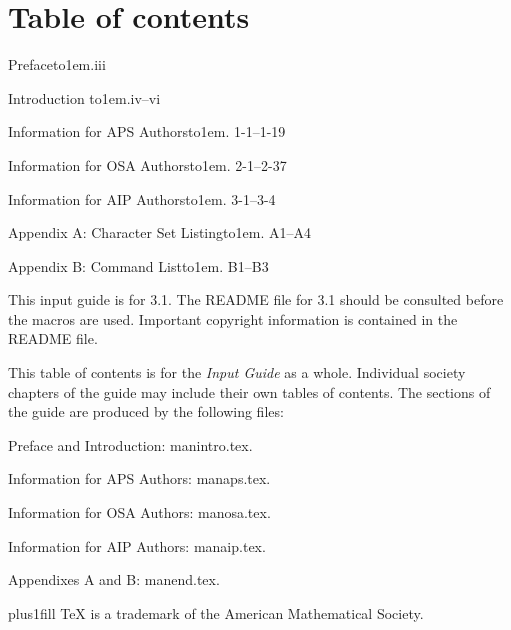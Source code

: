 \section*{Table of contents}
{ \rightskip\leftskip


\vspace{.4in}
{\parindent0pt\baselineskip

Preface\leaders\hbox to1em{\hfil.\hfil}\hfill iii

Introduction \leaders\hbox to1em{\hfil.\hfil}\hfill iv--vi

\REVTeX{} Information for APS Authors\leaders\hbox to1em{\hfil.\hfil}\hfill
1-1--1-19

\REVTeX{} Information for OSA Authors\leaders\hbox to1em{\hfil.\hfil}\hfill
2-1--2-37

\REVTeX{} Information for AIP Authors\leaders\hbox to1em{\hfil.\hfil}\hfill
3-1--3-4

Appendix A: Character Set Listing\leaders\hbox to1em{\hfil.\hfil}\hfill
A1--A4

Appendix B: Command List\leaders\hbox to1em{\hfil.\hfil}\hfill
B1--B3

\vspace{.4in}

}

This input guide is for \REVTeX{} 3.1. The README file for \REVTeX{}
3.1 should be consulted before the \REVTeX{} macros are used. Important
copyright information is contained in the README file.

\vspace{\baselineskip}

This table of contents is for the {\em \REVTeX{} Input Guide\/} as a whole.
Individual society chapters of the guide may include their own tables of
contents. The sections of the guide are produced by the following files:

Preface and Introduction: manintro.tex.

\REVTeX{} Information for APS Authors: manaps.tex.

\REVTeX{} Information for OSA Authors: manosa.tex.

\REVTeX{} Information for AIP Authors: manaip.tex.

Appendixes A and B: manend.tex.

\vfill

\begin{center}
 plus1fill \rightskip\leftskip
\TeX{} is a trademark of the American Mathematical Society.\par
\end{center}

}

